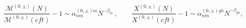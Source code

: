 \begin{equation}
\frac{\mathcal{M}^{(0,\pm )}(N)}{\mathcal{M}^{(0,\pm )}(cft)}-1\sim \alpha
_{nm}^{(0,\pm ){m}}N^{-\beta _{m}}\,,\qquad \frac{{X}^{(0,\pm )}(N)}{{X}%
^{(0,\pm )}(cft)}-1\sim \alpha _{nm}^{(0,\pm ){gh}}N^{-\beta _{gh}},
\label{eq_deviation}
\end{equation}

